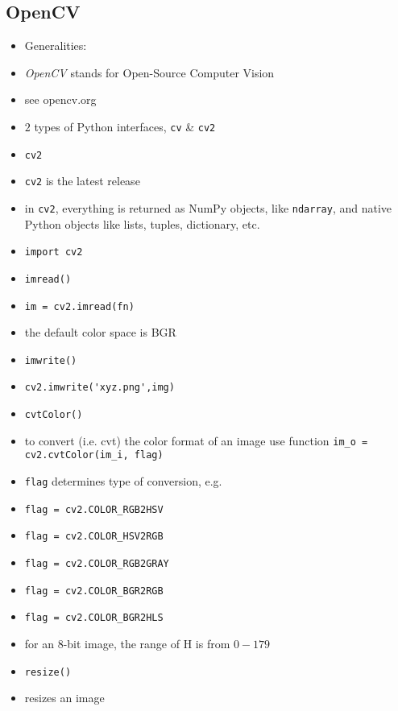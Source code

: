 \documentclass[onecolumn]{IEEEtran} %
\begin{document}
\subsection{OpenCV\label{opencv_sec}}
\begin{itemize}
    \item Generalities:
    \bi
        \item \emph{OpenCV} stands for Open-Source Computer Vision
        \bi
            \item see opencv.org
        \ei
        \item $2$ types of Python interfaces, \verb|cv| \& \verb|cv2|
    \ei
    \item \verb|cv2|
    \bi
        \item \verb|cv2| is the latest release
        \item in \verb|cv2|, everything is returned as NumPy objects, like \verb|ndarray|, and native Python objects like lists, tuples, dictionary, etc.
        \item \verb|import cv2|
    \ei
    \item \verb|imread()|
    \bi
        \item \verb|im = cv2.imread(fn)|
        \item the default color space is BGR
    \ei
    \item \verb|imwrite()|
    \bi
        \item \verb|cv2.imwrite('xyz.png',img)|
    \ei
    \item \verb|cvtColor()|
    \bi
      \item to convert (i.e. cvt) the color format of an image use function
      \newline\verb|im_o = cv2.cvtColor(im_i, flag)|
        \item \verb|flag| determines type of conversion, e.g.
        \bi
            \item \verb|flag = cv2.COLOR_RGB2HSV|
             \item \verb|flag = cv2.COLOR_HSV2RGB|
            \item \verb|flag = cv2.COLOR_RGB2GRAY|
            \item \verb|flag = cv2.COLOR_BGR2RGB|
             \item \verb|flag = cv2.COLOR_BGR2HLS|
        \ei
        \item for an 8-bit image, the range of H is from $0-179$
    \ei
    \item \verb|resize()|
    \bi
        \item resizes an image

\end{itemize}
\end{document}
